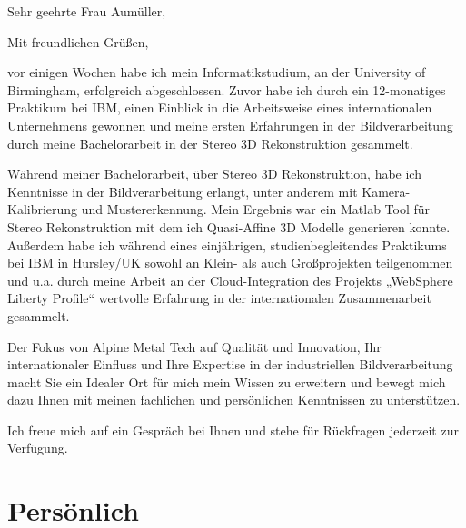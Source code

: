 \documentclass[11pt, a4,ngerman]{moderncv}        %
\begin{document}
\date{\myformat\today}
\subject{Bewerbung als ProgrammiererIn Bildverarbeitung}
\opening{Sehr geehrte Frau Aumüller,}
\closing{Mit freundlichen Grüßen,}
\makelettertitle
vor einigen Wochen habe ich mein Informatikstudium, an der University of Birmingham, erfolgreich abgeschlossen. Zuvor habe ich durch ein 12-monatiges Praktikum bei IBM, einen Einblick in die Arbeitsweise eines internationalen Unternehmens gewonnen und meine ersten Erfahrungen in der Bildverarbeitung durch meine Bachelorarbeit in der Stereo 3D Rekonstruktion gesammelt. 

Während meiner Bachelorarbeit, über Stereo 3D Rekonstruktion, habe ich Kenntnisse in der Bildverarbeitung erlangt, unter anderem mit Kamera-Kalibrierung und Mustererkennung. Mein Ergebnis war ein Matlab Tool für Stereo Rekonstruktion mit dem ich Quasi-Affine 3D Modelle generieren konnte. Außerdem habe ich während eines einjährigen, studienbegleitendes Praktikums bei IBM in Hursley/UK  sowohl an Klein- als auch Großprojekten teilgenommen und u.a. durch meine Arbeit an der Cloud-Integration des Projekts „WebSphere Liberty Profile“ wertvolle Erfahrung in der internationalen Zusammenarbeit gesammelt.

Der Fokus von Alpine Metal Tech auf Qualität und Innovation, Ihr internationaler Einfluss und Ihre Expertise in der industriellen Bildverarbeitung macht Sie ein Idealer Ort für mich mein Wissen zu erweitern und bewegt mich dazu Ihnen mit meinen fachlichen und persönlichen Kenntnissen zu unterstützen. 

Ich freue mich auf ein Gespräch bei Ihnen und stehe für Rückfragen jederzeit zur Verfügung. \\

\makeletterclosing

\clearpage                            %


\makecvtitle
\section{Persönlich}
\end{document}

